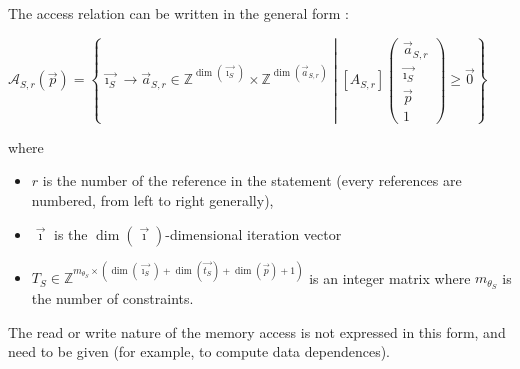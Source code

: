 \documentclass[paper=a4, fontsize=11pt]{scrartcl}
\numberwithin{equation}{section}        %
\numberwithin{figure}{section}          %
\numberwithin{table}{section}               %
\begin{document}
        The access relation can be written in the general form :
        \begin{center}
            $\mathcal{A}_{S,r}(\vec{p}) = 
            \left\{
                \vec{\imath_S} \to \vec{a}_{S,r} \in \mathbb{Z}^{\dim(\vec{\imath_S})}\times\mathbb{Z}^{\dim(\vec{a}_{S,r})}
                \middle|
                \left[A_{S,r}\right]\left(\begin{array}{c}\vec{a}_{S,r}\\\vec{\imath_S}\\\vec{p}\\1\end{array}\right)
                \geq \vec{0}
            \right\}$
        \end{center}
        where 
        \begin{itemize}
            \item $r$ is the number of the reference in the statement (every references are
                numbered, from left to right generally),
            \item $\vec{\imath}$ is the $\dim(\vec{\imath})$-dimensional iteration vector
            \item $T_S \in \mathbb{Z}^{m_{\theta_S}\times(\dim(\vec{\imath_S})+\dim(\vec{t_S})+\dim(\vec{p})+1)}$
                is an integer matrix where $m_{\theta_S}$ is the number of constraints.
        \end{itemize}

        The read or write nature of the memory access is not expressed in this form,
        and need to be given (for example, to compute data dependences).

\end{document}

